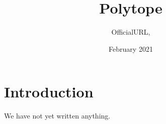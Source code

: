 \documentclass{article}
\title{Polytope}
\author{OfficialURL, }
\date{February 2021}
\begin{document}
\maketitle

\section{Introduction}
We have not yet written anything.
\end{document}
